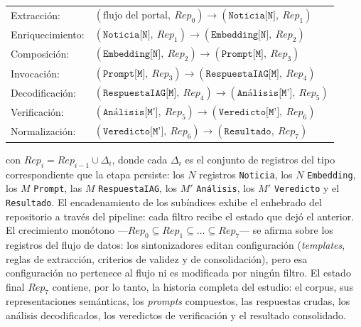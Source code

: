 \documentclass[12pt]{report}
\begin{document}
\begin{center}
  \begin{tabular}{@{}ll@{}}
    Extracción:      & \((\text{flujo del portal},\ \mathit{Rep}_0) \to (\texttt{Noticia[N]},\ \mathit{Rep}_1)\)    \\[2pt]
    Enriquecimiento: & \((\texttt{Noticia[N]},\ \mathit{Rep}_1) \to (\texttt{Embedding[N]},\ \mathit{Rep}_2)\)      \\[2pt]
    Composición:     & \((\texttt{Embedding[N]},\ \mathit{Rep}_2) \to (\texttt{Prompt[M]},\ \mathit{Rep}_3)\)       \\[2pt]
    Invocación:      & \((\texttt{Prompt[M]},\ \mathit{Rep}_3) \to (\texttt{RespuestaIAG[M]},\ \mathit{Rep}_4)\)    \\[2pt]
    Decodificación:  & \((\texttt{RespuestaIAG[M]},\ \mathit{Rep}_4) \to (\texttt{Análisis[M']},\ \mathit{Rep}_5)\) \\[2pt]
    Verificación:    & \((\texttt{Análisis[M']},\ \mathit{Rep}_5) \to (\texttt{Veredicto[M']},\ \mathit{Rep}_6)\)   \\[2pt]
    Normalización:   & \((\texttt{Veredicto[M']},\ \mathit{Rep}_6) \to (\texttt{Resultado},\ \mathit{Rep}_7)\)      \\
  \end{tabular}
\end{center}

con \(\mathit{Rep}_i = \mathit{Rep}_{i-1} \cup \Delta_i\), donde cada \(\Delta_i\) es el conjunto de registros del tipo correspondiente que la etapa persiste: los \(N\) registros \texttt{Noticia}, los \(N\) \texttt{Embedding}, los \(M\) \texttt{Prompt}, las \(M\) \texttt{RespuestaIAG}, los \(M'\) \texttt{Análisis}, los \(M'\) \texttt{Veredicto} y el \texttt{Resultado}. El encadenamiento de los subíndices exhibe el enhebrado del repositorio a través del pipeline: cada filtro recibe el estado que dejó el anterior. El crecimiento monótono ---\(\mathit{Rep}_0 \subseteq \mathit{Rep}_1 \subseteq \dots \subseteq \mathit{Rep}_7\)--- se afirma sobre los registros del flujo de datos: los sintonizadores editan configuración (\textit{templates}, reglas de extracción, criterios de validez y de consolidación), pero esa configuración no pertenece al flujo ni es modificada por ningún filtro. El estado final \(\mathit{Rep}_7\) contiene, por lo tanto, la historia completa del estudio: el corpus, sus representaciones semánticas, los \textit{prompts} compuestos, las respuestas crudas, los análisis decodificados, los veredictos de verificación y el resultado consolidado.
\end{document}

